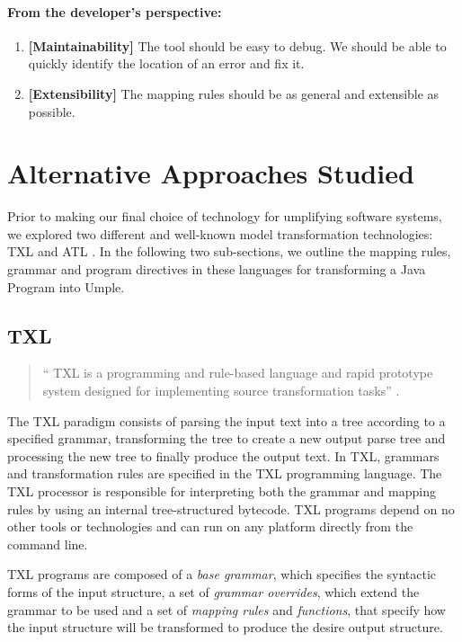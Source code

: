 \paragraph*{From the developer's perspective:}
\begin{enumerate}[resume]
\item \textbf{[Maintainability]} The tool should be easy to debug. We should be able to quickly identify the location of an error and fix it.

\item \textbf{[Extensibility]} The mapping rules should be as general and extensible as possible. 
\end{enumerate}


\section{Alternative Approaches Studied}
Prior to making our final choice of technology for umplifying software systems, we explored two different and well-known model transformation technologies: TXL \cite{Cordy2006} and ATL \cite{atl}. In the following two sub-sections, we outline the mapping rules, grammar and program directives in these languages for transforming a Java Program into Umple. 

\subsection{TXL}

\begin{quote}`` TXL is a programming and rule-based language and rapid prototype system designed for implementing source transformation tasks'' \cite{Cordy2006}. \end{quote}

The TXL paradigm consists of parsing the input text into a tree according to a specified grammar, transforming the tree to create a new output parse tree and processing the new tree to finally produce the output text. In TXL, grammars and transformation rules are specified in the TXL programming language. The TXL processor is responsible for interpreting both the grammar and mapping rules by using an internal tree-structured bytecode. TXL programs depend on no other tools or technologies and can run on any platform directly from the command line.

TXL programs are composed of a \textit{base grammar}, which specifies the syntactic forms of the input structure, a set of \textit{grammar overrides}, which extend the grammar to be used and a set of \textit{mapping rules} and  \textit{functions}, that specify how the input structure will be transformed to produce the desire output structure.


